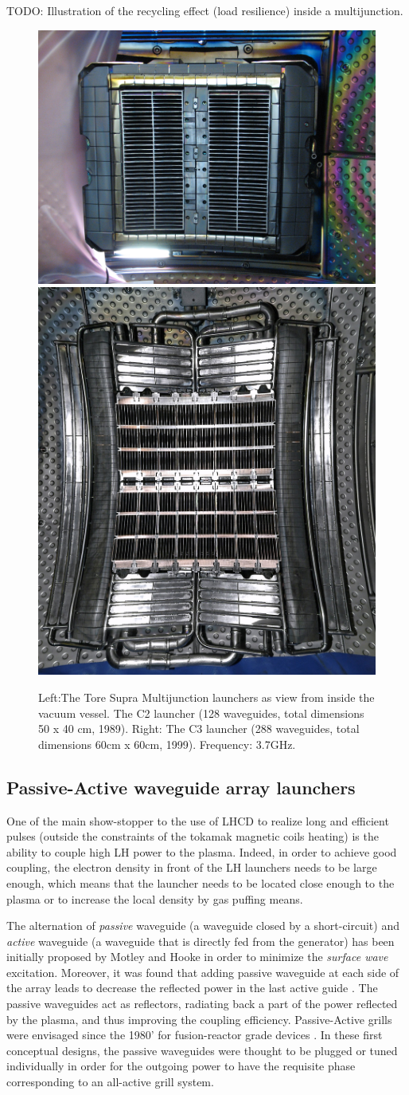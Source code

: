 TODO: Illustration of the recycling effect (load resilience) inside a multijunction.


\begin{figure}
\centering
\includegraphics[width=0.3\linewidth]{Figures/LHCD/ToreSupra_C2}
\includegraphics[width=0.4\linewidth]{Figures/LHCD/ToreSupra_C3}
\caption{Left:The Tore Supra Multijunction launchers as view from inside the vacuum vessel. The C2 launcher (128 waveguides, total dimensions 50 x 40 cm, 1989). Right: The C3 launcher (288 waveguides, total dimensions 60cm x 60cm, 1999). Frequency: 3.7GHz.}
\label{fig:toresupraC2C3}
\end{figure}


\subsection{Passive-Active waveguide array launchers}
One of the main show-stopper to the use of LHCD to realize long and efficient pulses (outside the constraints of the tokamak magnetic coils heating) is the ability to couple high LH power to the plasma. Indeed, in order to achieve good coupling, the electron density in front of the LH launchers needs to be large enough, which means that the launcher needs to be located close enough to the plasma or to increase the local density by gas puffing means. 

The alternation of \emph{passive} waveguide (a waveguide closed by a short-circuit) and \emph{active} waveguide (a waveguide that is directly fed from the generator) has been initially proposed by Motley and Hooke \parencite{Motley1980} in order to minimize the \emph{surface wave} excitation. Moreover, it was found that adding passive waveguide at each side of the array leads to decrease the reflected power in the last active guide \parencite{Krapchev1978, Motley1980B}. The passive waveguides act as reflectors, radiating back a part of the power reflected by the plasma, and thus improving the coupling efficiency. Passive-Active grills were envisaged since the 1980' for fusion-reactor grade devices \parencite{Ehst1982}. In these first conceptual designs, the passive waveguides were thought to be plugged or tuned individually in order for the outgoing power to have the requisite phase corresponding to an all-active grill system. 

